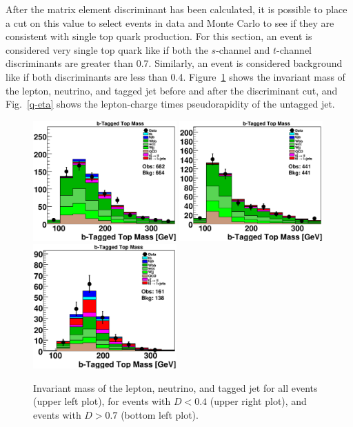 After the matrix element discriminant has been calculated, it is
possible to place a cut on this value to select events in data and
Monte Carlo to see if they are consistent with single top quark
production. For this section, an event is considered very single top
quark like if both the $s$-channel and $t$-channel discriminants are
greater than 0.7. Similarly, an event is considered background like if
both discriminants are less than 0.4. Figure~\ref{top-mass} shows the
invariant mass of the lepton, neutrino, and tagged jet before and
after the discriminant cut, and Fig.~\ref{q-eta} shows the
lepton-charge times pseudorapidity of the untagged jet.

\begin{figure}[!h!tbp]
\includegraphics[width=0.49\textwidth]
{eps/MatrixElement/topovars/BTaggedTopMass_0.eps}
\includegraphics[width=0.49\textwidth]
{eps/MatrixElement/topovars/BTaggedTopMass_-0.4.eps}
\includegraphics[width=0.49\textwidth]
{eps/MatrixElement/topovars/BTaggedTopMass_0.7.eps}
\vspace{-0.1in}
\caption{Invariant mass of the lepton, neutrino, and tagged
jet for all events (upper left plot), for events with $D < 0.4$ (upper right plot), and events with $D > 0.7$ (bottom left plot).}
\label{top-mass}
\end{figure}

